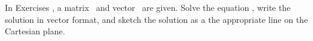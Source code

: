 {\noin In Exercises}
{, a matrix \tta\ and vector \vb\ are given. 
Solve the equation \ttaxb, write the solution in vector format, and sketch the solution as a the appropriate line on the Cartesian plane.}
